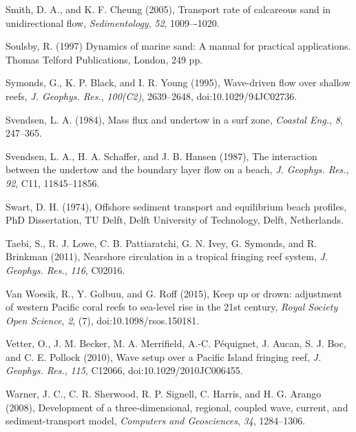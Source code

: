 \documentclass[default,jgrga]{agutex2015}
\begin{document}
\begin{article}
\begin{thebibliography}{}
Smith, D. A., and K. F. Cheung (2005), Transport rate of calcareous sand in unidirectional flow, \textit{Sedimentology}, \textit{52}, 1009–-1020.

Soulsby, R. (1997) Dynamics of marine sand: A manual for practical applications. Thomas Telford Publications, London, 249 pp.

Symonds, G., K. P. Black, and I. R. Young (1995), Wave-driven flow over shallow reefs, \textit{J. Geophys. Res.}, \textit{100(C2)}, 2639--2648, doi:10.1029/94JC02736.

Svendsen, L. A. (1984), Mass flux and undertow in a surf zone, \textit{Coastal Eng.}, \textit{8}, 247--365.

Svendsen, L. A., H. A. Schaffer, and J. B. Hansen (1987), The interaction between the undertow and the boundary layer flow on a beach, \textit{J. Geophys. Res.}, \textit{92}, C11, 11845--11856.

Swart, D. H. (1974), Offshore sediment transport and equilibrium beach profiles, PhD Dissertation, TU Delft, Delft University of Technology, Delft, Netherlands.

Taebi, S., R. J. Lowe, C. B. Pattiaratchi, G. N. Ivey,  G. Symonds, and R. Brinkman (2011), Nearshore circulation in a
tropical fringing reef system, \textit{J. Geophys. Res.}, \textit{116}, C02016.

Van Woesik, R., Y. Golbuu, and G. Roff (2015), Keep up or drown: adjustment of western Pacific coral reefs to sea-level rise in the 21st century, \textit{Royal Society Open Science}, \textit{2}, (7), doi:10.1098/rsos.150181.

Vetter, O., J. M. Becker, M. A. Merrifield, A.-C. P\'equignet, J. Aucan, S. J. Boc, and C. E. Pollock (2010), Wave setup over a Pacific Island fringing reef, \textit{J. Geophys. Res.}, \textit{115}, C12066, doi:10.1029/2010JC006455.

Warner, J. C., C. R. Sherwood, R. P. Signell, C. Harris, and H. G. Arango (2008), Development of a three-dimensional, regional, coupled wave, current, and sediment-transport model, \textit{Computers and Geosciences}, \textit{34}, 1284--1306.


\end{thebibliography}
\end{article}
\end{document}
